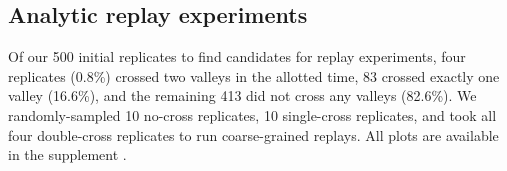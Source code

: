 \subsection{Analytic replay experiments}
Of our 500 initial replicates to find candidates for replay experiments, four replicates (0.8\%) crossed two valleys in the allotted time, 83 crossed exactly one valley (16.6\%), and the remaining 413 did not cross any valleys (82.6\%). 
We randomly-sampled 10 no-cross replicates, 10 single-cross replicates, and took all four double-cross replicates to run coarse-grained replays.
All plots are available in the supplement \citep{austin_ferguson_2024_11507982}. 

